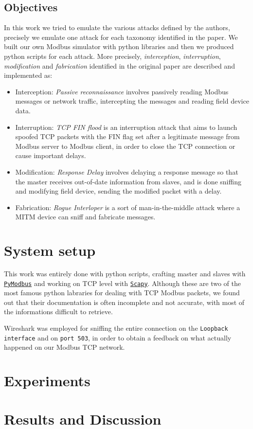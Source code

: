 \documentclass[12pt]{article}
\begin{document}
\subsection{Objectives}
In this work we tried to emulate the various attacks defined by the authors, precisely we emulate one attack for each taxonomy identified in the paper. We built our own Modbus simulator with python libraries and then we produced python scripts for each attack.
More precisely, \textit{interception}, \textit{interruption}, \textit{modification} and \textit{fabrication} identified in the original paper are described and implemented as:
\begin{itemize}
    \item Interception: \textit{Passive reconnaissance} involves passively reading Modbus messages or network traffic, intercepting the messages and reading field device data.
    \item Interruption: \textit{TCP FIN flood} is an interruption attack that aims to launch spoofed TCP packets with the FIN flag set after a legitimate message from Modbus server to Modbus client, in order to close the TCP connection or cause important delays.
    \item Modification: \textit{Response Delay} involves delaying a response message so that the master receives out-of-date information from slaves, and is done sniffing and modifying field device, sending the modified packet with a delay.
    \item Fabrication: \textit{Rogue Interloper} is a sort of man-in-the-middle attack where a MITM device can sniff and fabricate messages.
\end{itemize}

\section{System setup}
This work was entirely done with python scripts, crafting master and slaves with \href{https://pymodbus.readthedocs.io/en/latest/}{\texttt{PyModbus}} and working on TCP level with \href{https://scapy.readthedocs.io/en/latest/}{\texttt{Scapy}}.
Although these are two of the most famous python labraries for dealing with TCP Modbus packets, we found out that their documentation is often incomplete and not accurate, with most of the informations difficult to retrieve. 

Wireshark was employed for sniffing the entire connection on the \texttt{Loopback interface} and on \texttt{port 503}, in order to obtain a feedback on what actually happened on our Modbus TCP network.

\section{Experiments}
\section{Results and Discussion}
\printbibliography 
\end{document}
